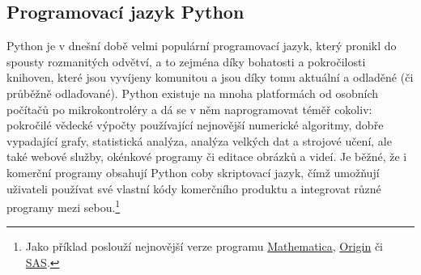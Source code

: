 \documentclass[a4paper,11pt,twoside]{article}
\theoremstyle{red}
\theoremstyle{green}
\begin{document}
\subsection{Programovací jazyk Python}
    Python je v dnešní době velmi populární programovací jazyk, který pronikl do spousty rozmanitých odvětví, a to zejména díky bohatosti a pokročilosti knihoven, které jsou vyvíjeny komunitou a jsou díky tomu aktuální a odladěné (či průběžně odlaďované).
    Python existuje na mnoha platformách od osobních počítačů po mikrokontroléry a dá se v něm naprogramovat téměř cokoliv: pokročilé vědecké výpočty používající nejnovější numerické algoritmy, dobře vypadající grafy, statistická analýza, analýza velkých dat a strojové učení, ale také webové služby, okénkové programy či editace obrázků a videí.
    Je běžné, že i komerční programy obsahují Python coby skriptovací jazyk, čímž umožňují uživateli používat své vlastní kódy  komerčního produktu a integrovat různé programy mezi sebou.\footnote{
        Jako příklad poslouží nejnovější verze programu \href{https://www.wolfram.com/language/12/external-system-integration/evaluate-python-in-a-notebook.html}{Mathematica}, \href{https://www.originlab.com/doc/python/Run-Python-in-Origin}{Origin} či \href{https://developer.sas.com/guides/python.html}{SAS}.
    }
    
\end{document}

